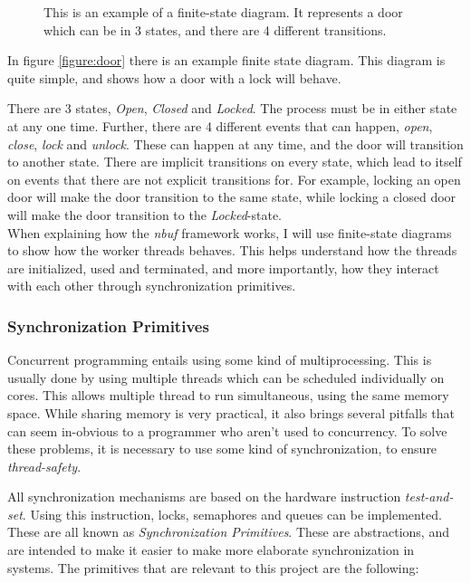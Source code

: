 \documentclass[a4paper]{article}
\newcommand{\nbuf}{\textit{nbuf} }
\begin{document}
\begin{figure}
	\begin{adjustwidth}{-0.5in}{-0.5in}
    \centering
    \def\svgwidth{\columnwidth}
    
  	\caption{This is an example of a finite-state diagram. It represents a door which can be in 3 states, and there are 4 different transitions.}
	\label{figure:door}
	\end{adjustwidth}
\end{figure}

In figure \autoref{figure:door} there is an example finite state diagram. This diagram is quite simple, and shows how a door with a lock will behave.

There are 3 states, \textit{Open}, \textit{Closed} and \textit{Locked}. The process must be in either state at any one time. Further, there are 4 different events that can happen, \textit{open}, \textit{close}, \textit{lock} and \textit{unlock}. These can happen at any time, and the door will transition to another state. There are implicit transitions on every state, which lead to itself on events that there are not explicit transitions for. For example, locking an open door will make the door transition to the same state, while locking a closed door will make the door transition to the \textit{Locked}-state.\\

When explaining how the \nbuf framework works, I will use finite-state diagrams to show how the worker threads behaves. This helps understand how the threads are initialized, used and terminated, and more importantly, how they interact with each other through synchronization primitives.


\subsubsection{Synchronization Primitives}
Concurrent programming entails using some kind of multiprocessing. This is usually done by using multiple threads which can be scheduled individually on cores. This allows multiple thread to run simultaneous, using the same memory space. While sharing memory is very practical, it also brings several pitfalls that can seem in-obvious to a programmer who aren't used to concurrency. To solve these problems, it is necessary to use some kind of synchronization, to ensure \textit{thread-safety}.

All synchronization mechanisms are based on the hardware instruction \textit{test-and-set}. Using this instruction, locks, semaphores and queues can be implemented. These are all known as \textit{Synchronization Primitives}. These are abstractions, and are intended to make it easier to make more elaborate synchronization in systems. The primitives that are relevant to this project are the following:
\end{document}
